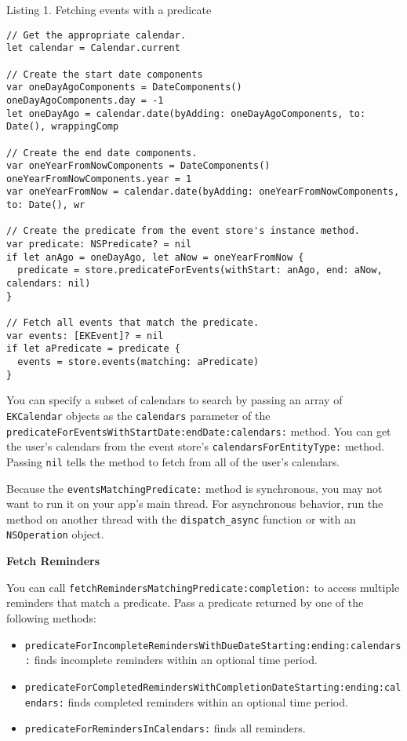 \documentclass{article}
\begin{document}
Listing 1. Fetching events with a predicate
\begin{verbatim}
// Get the appropriate calendar.
let calendar = Calendar.current

// Create the start date components
var oneDayAgoComponents = DateComponents()
oneDayAgoComponents.day = -1
let oneDayAgo = calendar.date(byAdding: oneDayAgoComponents, to: Date(), wrappingComp

// Create the end date components.
var oneYearFromNowComponents = DateComponents()
oneYearFromNowComponents.year = 1
var oneYearFromNow = calendar.date(byAdding: oneYearFromNowComponents, to: Date(), wr

// Create the predicate from the event store's instance method.
var predicate: NSPredicate? = nil
if let anAgo = oneDayAgo, let aNow = oneYearFromNow {
  predicate = store.predicateForEvents(withStart: anAgo, end: aNow, calendars: nil)
}

// Fetch all events that match the predicate.
var events: [EKEvent]? = nil
if let aPredicate = predicate {
  events = store.events(matching: aPredicate)
}
\end{verbatim}

You can specify a subset of calendars to search by passing an array of \texttt{EKCalendar} objects as the \texttt{calendars} parameter of the \texttt{predicateForEventsWithStartDate:endDate:calendars:} method. You can get the user's calendars from the event store's \texttt{calendarsForEntityType:} method. Passing \texttt{nil} tells the method to fetch from all of the user's calendars.

Because the \texttt{eventsMatchingPredicate:} method is synchronous, you may not want to run it on your app's main thread. For asynchronous behavior, run the method on another thread with the \texttt{dispatch\_async} function or with an \texttt{NSOperation} object.

\textbf{Fetch Reminders}

You can call \texttt{fetchRemindersMatchingPredicate:completion:} to access multiple reminders that match a predicate. Pass a predicate returned by one of the following methods:

\begin{itemize}
    \item \texttt{predicateForIncompleteRemindersWithDueDateStarting:ending:calendars:} finds incomplete reminders within an optional time period.
    \item \texttt{predicateForCompletedRemindersWithCompletionDateStarting:ending:calendars:} finds completed reminders within an optional time period.
    \item \texttt{predicateForRemindersInCalendars:} finds all reminders.
\end{itemize}
\end{document}
